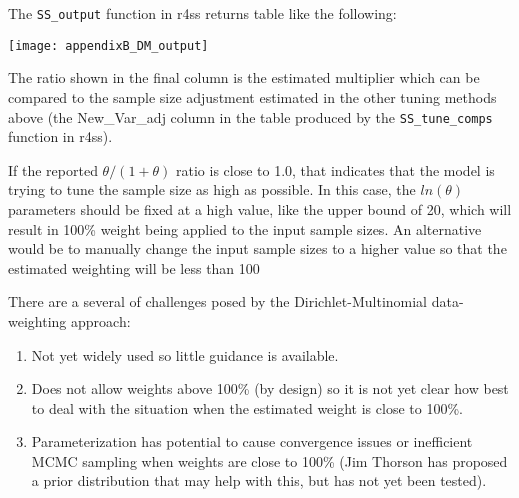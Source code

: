 The \texttt{SS\_output} function in r4ss returns table like the following:

\begin{center}
	\texttt{[image: appendixB\_DM\_output]}\\
\end{center}

The ratio shown in the final column is the estimated multiplier which can be compared to the sample size adjustment estimated in the other tuning methods above (the New\_Var\_adj column in the table produced by the \texttt{SS\_tune\_comps} function in r4ss).

If the reported $\theta/(1+\theta)$ ratio is close to 1.0, that indicates that the model is trying to tune the sample size as high as possible. In this case, the $ln(\theta)$ parameters should be fixed at a high value, like the upper bound of 20, which will result in 100\% weight being applied to the input sample sizes. An alternative would be to manually change the input sample sizes to a higher value so that the estimated weighting will be less than 100%



There are a several of challenges posed by the Dirichlet-Multinomial data-weighting approach:
\begin{enumerate}
	\item Not yet widely used so little guidance is available.
	
	\item Does not allow weights above 100\% (by design) so it is not yet clear how best to deal with the situation when the estimated weight is close to 100\%.
	
	\item Parameterization has potential to cause convergence issues or inefficient MCMC sampling when weights are close to 100\% (Jim Thorson has proposed a prior distribution that may help with this, but has not yet been tested).
\end{enumerate}